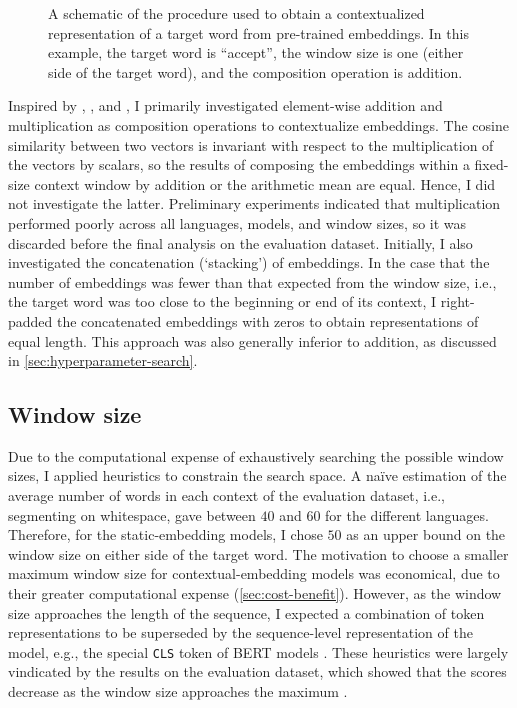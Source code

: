 \begin{figure}
  \centering
  
  \caption{A schematic of the procedure used to
    obtain a contextualized representation of a target word from pre-trained embeddings.
    In this example, the target word is ``accept'', the window size is one (either side of
    the target word), and the composition operation is addition.
  }
  \label{figure:schematic-procedure}
\end{figure}

Inspired by \textcites{Landauer1997}, \textcites{Kintsch2001}, and
\textcites{Mitchell2008}, I primarily investigated element-wise addition and
multiplication as composition operations to contextualize embeddings.
The cosine similarity between two vectors is invariant with respect to the
multiplication of the vectors by scalars, so the results of composing the embeddings
within a fixed-size context window by addition or the arithmetic mean are equal.
Hence, I did not investigate the latter.
Preliminary experiments indicated that multiplication performed poorly across all
languages, models, and window sizes, so it was discarded before the final analysis on
the evaluation dataset.
Initially, I also investigated the concatenation (`stacking') of embeddings.
In the case that the number of embeddings was fewer than that expected from the window
size, i.e., the target word was too close to the beginning or end of its context, I
right-padded the concatenated embeddings with zeros to obtain representations of equal
length.
This approach was also generally inferior to addition, as discussed in
\cref{sec:hyperparameter-search}.

\subsection{Window size}
\label{sec:window-size}

Due to the computational expense of exhaustively searching the possible window sizes, I
applied heuristics to constrain the search space.
A naïve estimation of the average number of words in each context of the evaluation
dataset, i.e., segmenting on whitespace, gave between $40$ and $60$ for the different
languages.
Therefore, for the static-embedding models, I chose $50$ as an upper bound on the
window size on either side of the target word.
The motivation to choose a smaller maximum window size for contextual-embedding models
was economical, due to their greater computational expense (\cref{sec:cost-benefit}).
However, as the window size approaches the length of the sequence, I expected a
combination of token representations to be superseded by the sequence-level
representation of the model, e.g., the special \texttt{CLS} token of BERT models
\parencites[4174]{Devlin2019}.
These heuristics were largely vindicated by the results on the evaluation dataset,
which showed that the scores decrease as the window size approaches the maximum
.
